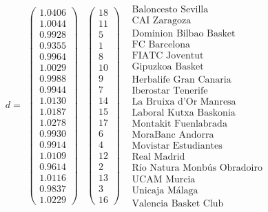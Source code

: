 	
	\[d=
	\begin{array}{ccc}
	\left(\begin{array}{c}
	1.0406\\
	1.0044\\
	0.9928\\
	0.9355\\
	0.9964\\
	1.0029\\
	0.9988\\
	0.9944\\
	1.0130\\
	1.0187\\
	1.0278\\
	0.9930\\
	0.9914\\
	1.0109\\
	0.9614\\
	1.0116\\
	0.9837\\
	1.0229
	\end{array} \right) & \left(\begin{array}{c}
	18\\
	11\\
	5\\
	1\\
	8\\
	10\\
	9\\
	7\\
	14\\
	15\\
	17\\
	6\\
	4\\
	12\\
	2\\
	13\\
	3\\
	16
	\end{array} \right) & \begin{array}{c}
	\text{Baloncesto Sevilla}\\
	\text{CAI Zaragoza} \\
	\text{Dominion Bilbao Basket} \\
	\text{FC Barcelona} \\
	\text{FIATC Joventut} \\
	\text{Gipuzkoa Basket} \\
	\text{Herbalife Gran Canaria} \\
	\text{Iberostar Tenerife} \\
	\text{La Bruixa d'Or Manresa} \\
	\text{Laboral Kutxa Baskonia} \\
	\text{Montakit Fuenlabrada} \\
	\text{MoraBanc Andorra} \\
	\text{Movistar Estudiantes} \\
	\text{Real Madrid} \\
	\text{Río Natura Monbús Obradoiro} \\
	\text{UCAM Murcia} \\
	\text{Unicaja Málaga} \\
	\text{Valencia Basket Club}
	\end{array}
	\end{array}
	\]
	
